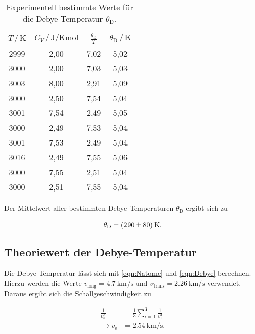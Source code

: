 \begin{table}
    \centering
    \caption{Experimentell bestimmte Werte für die Debye-Temperatur $\theta_\text{D}$.}
    \label{tab:mess3}
    \begin{tabular}{c c c c}
    \toprule
    $\bar{T} \,/\, \si{\kelvin}$ & $C_V \,/\, \si{\joule\per\kelvin\mole}$ & $\frac{\theta_\text{D}}{T}$
    & $\theta_\text{D} \,/\, \si{\kelvin}$\\
    \midrule 
        2999 & 2,00 & 7,02 & 5,02\\
        3000 & 2,00 & 7,03 & 5,03\\
        3003 & 8,00 & 2,91 & 5,09\\
        3000 & 2,50 & 7,54 & 5,04\\
        3001 & 7,54 & 2,49 & 5,05\\
        3000 & 2,49 & 7,53 & 5,04\\
        3001 & 7,53 & 2,49 & 5,04\\
        3016 & 2,49 & 7,55 & 5,06\\
        3000 & 7,55 & 2,51 & 5,04\\
        3000 & 2,51 & 7,55 & 5,04\\
    \bottomrule
    \end{tabular}
\end{table}

Der Mittelwert aller bestimmten Debye-Temperaturen $\theta_\text{D}$ ergibt sich zu 

\begin{equation*}
    \bar{\theta_\text{D}} = \SI{290+-80}{\kelvin}.
\end{equation*}

\subsection{Theoriewert der Debye-Temperatur}

Die Debye-Temperatur lässt sich mit \eqref{eqn:Natome} und \eqref{eqn:Debye} berechnen. Hierzu werden die Werte $v_\text{long} = \SI{4.7}{\kilo\meter\per\second}$ und
$v_\text{trans} = \SI{2.26}{\kilo\meter\per\second}$ \cite{Anleitung} verwendet. Daraus ergibt sich die Schallgeschwindigkeit zu 

\begin{align*}
    \frac{1}{v_\text{s}^3} &= \frac{1}{3} \sum_{i=1}^3 \frac{1}{v_1^3}\\
    \rightarrow v_\text{s} &= \SI{2.54}{\kilo\meter\per\second}. 
\end{align*}

